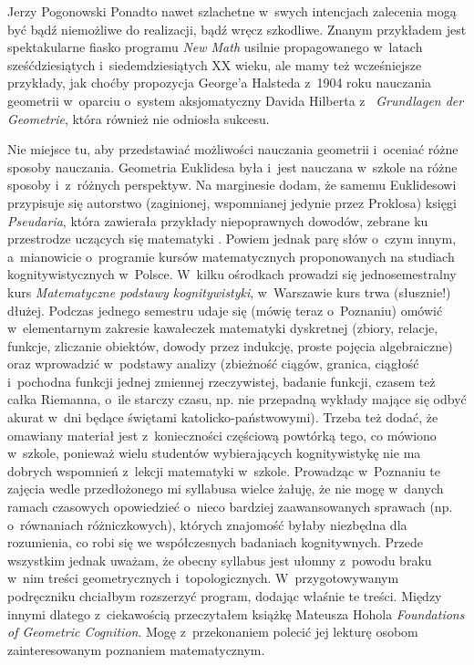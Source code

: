 \begin{newrevplenv}{Jerzy Pogonowski}
Ponadto nawet szlachetne w~swych intencjach zalecenia mogą być
bądź niemożliwe do realizacji, bądź wręcz szkodliwe. Znanym
przykładem jest spektakularne fiasko programu {\em New Math}
usilnie propagowanego w~latach sześćdziesiątych i~siedemdziesiątych XX wieku, ale mamy też wcześniejsze przykłady,
jak choćby propozycja George'a Halsteda z~1904 roku nauczania
geometrii w~oparciu o~system aksjomatyczny Davida Hilberta z~{\em
Grundlagen der Geometrie}, która również nie odniosła sukcesu.

Nie miejsce tu, aby przedstawiać możliwości nauczania geometrii i~oceniać różne sposoby nauczania. Geometria Euklidesa była i~jest
nauczana w~szkole na różne sposoby i~z~różnych perspektyw. Na
marginesie dodam, że samemu Euklidesowi przypisuje się autorstwo
(zaginionej, wspomnianej jedynie przez Proklosa) księgi {\em
Pseudaria}, która zawierała przykłady niepoprawnych dowodów,
zebrane ku przestrodze uczących się matematyki \parencite{acerbi_euclids_2008}.
Powiem jednak parę słów o~czym innym, a~mianowicie o~programie
kursów matematycznych proponowanych na studiach kognitywistycznych
w~Polsce. W~kilku ośrodkach prowadzi się jednosemestralny kurs
{\em Matematyczne podstawy kognitywistyki}, w~Warszawie kurs trwa
(słusznie!) dłużej. Podczas jednego semestru udaje się (mówię
teraz o~Poznaniu) omówić w~elementarnym zakresie kawałeczek
matematyki dyskretnej (zbiory, relacje, funkcje, zliczanie
obiektów, dowody przez indukcję, proste pojęcia algebraiczne) oraz
wprowadzić w~podstawy analizy (zbieżność ciągów, granica, ciągłość
i~pochodna funkcji jednej zmiennej rzeczywistej, badanie funkcji,
czasem też całka Riemanna, o~ile starczy czasu, np. nie przepadną
wykłady mające się odbyć akurat w~dni będące świętami
katolicko-państwowymi). Trzeba też dodać, że omawiany materiał
jest z~konieczności częściową powtórką tego, co mówiono w~szkole,
ponieważ wielu studentów wybierających kognitywistykę nie ma
dobrych wspomnień z~lekcji matematyki w~szkole. Prowadząc w~Poznaniu te zajęcia wedle przedłożonego mi syllabusa wielce
żałuję, że nie mogę w~danych ramach czasowych opowiedzieć o~nieco
bardziej zaawansowanych sprawach (np. o~równaniach różniczkowych),
których znajomość byłaby niezbędna dla rozumienia, co robi się we
współczesnych badaniach kognitywnych. Przede wszystkim jednak
uważam, że obecny syllabus jest ułomny z~powodu braku w~nim treści
geometrycznych i~topologicznych. W~przygotowywanym podręczniku
chciałbym rozszerzyć program, dodając właśnie te treści. Między
innymi dlatego z~ciekawością przeczytałem książkę Mateusza Hohola
{\em Foundations of Geometric Cognition}. Mogę z~przekonaniem
polecić jej lekturę osobom zainteresowanym poznaniem
matematycznym.





\end{newrevplenv}
